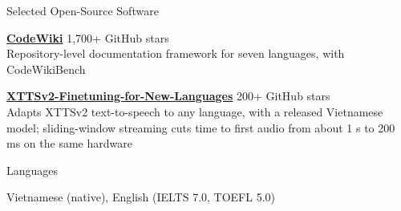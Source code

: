 \documentclass{resume} %
\begin{document}
\begin{rSection}{Selected Open-Source Software}

\textbf{\href{https://github.com/FSoft-AI4Code/CodeWiki}{CodeWiki}}
\hfill 1,700+ GitHub stars\\
Repository-level documentation framework for seven languages, with CodeWikiBench

\vspace{0.15em}

\textbf{\href{https://github.com/anhnh2002/XTTSv2-Finetuning-for-New-Languages}
{XTTSv2-Finetuning-for-New-Languages}}
\hfill 200+ GitHub stars\\
Adapts XTTSv2 text-to-speech to any language, with a released Vietnamese model;
sliding-window streaming cuts time to first audio from about 1 s to 200 ms on the same hardware

\end{rSection}



\begin{rSection}{Languages}

Vietnamese (native), English (IELTS 7.0, TOEFL 5.0)

\end{rSection}

\ifdefined\norefs\else
\end{document}

